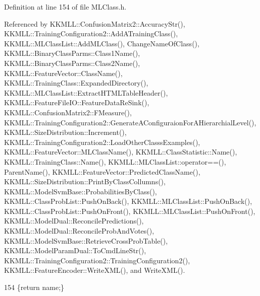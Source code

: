 Definition at line 154 of file M\+L\+Class.\+h.



Referenced by K\+K\+M\+L\+L\+::\+Confusion\+Matrix2\+::\+Accuracy\+Str(), K\+K\+M\+L\+L\+::\+Training\+Configuration2\+::\+Add\+A\+Training\+Class(), K\+K\+M\+L\+L\+::\+M\+L\+Class\+List\+::\+Add\+M\+L\+Class(), Change\+Name\+Of\+Class(), K\+K\+M\+L\+L\+::\+Binary\+Class\+Parms\+::\+Class1\+Name(), K\+K\+M\+L\+L\+::\+Binary\+Class\+Parms\+::\+Class2\+Name(), K\+K\+M\+L\+L\+::\+Feature\+Vector\+::\+Class\+Name(), K\+K\+M\+L\+L\+::\+Training\+Class\+::\+Expanded\+Directory(), K\+K\+M\+L\+L\+::\+M\+L\+Class\+List\+::\+Extract\+H\+T\+M\+L\+Table\+Header(), K\+K\+M\+L\+L\+::\+Feature\+File\+I\+O\+::\+Feature\+Data\+Re\+Sink(), K\+K\+M\+L\+L\+::\+Confusion\+Matrix2\+::\+F\+Measure(), K\+K\+M\+L\+L\+::\+Training\+Configuration2\+::\+Generate\+A\+Configuraion\+For\+A\+Hierarchial\+Level(), K\+K\+M\+L\+L\+::\+Size\+Distribution\+::\+Increment(), K\+K\+M\+L\+L\+::\+Training\+Configuration2\+::\+Load\+Other\+Classs\+Examples(), K\+K\+M\+L\+L\+::\+Feature\+Vector\+::\+M\+L\+Class\+Name(), K\+K\+M\+L\+L\+::\+Class\+Statistic\+::\+Name(), K\+K\+M\+L\+L\+::\+Training\+Class\+::\+Name(), K\+K\+M\+L\+L\+::\+M\+L\+Class\+List\+::operator==(), Parent\+Name(), K\+K\+M\+L\+L\+::\+Feature\+Vector\+::\+Predicted\+Class\+Name(), K\+K\+M\+L\+L\+::\+Size\+Distribution\+::\+Print\+By\+Class\+Collumns(), K\+K\+M\+L\+L\+::\+Model\+Svm\+Base\+::\+Probabilities\+By\+Class(), K\+K\+M\+L\+L\+::\+Class\+Prob\+List\+::\+Push\+On\+Back(), K\+K\+M\+L\+L\+::\+M\+L\+Class\+List\+::\+Push\+On\+Back(), K\+K\+M\+L\+L\+::\+Class\+Prob\+List\+::\+Push\+On\+Front(), K\+K\+M\+L\+L\+::\+M\+L\+Class\+List\+::\+Push\+On\+Front(), K\+K\+M\+L\+L\+::\+Model\+Dual\+::\+Reconcile\+Predictions(), K\+K\+M\+L\+L\+::\+Model\+Dual\+::\+Reconcile\+Prob\+And\+Votes(), K\+K\+M\+L\+L\+::\+Model\+Svm\+Base\+::\+Retrieve\+Cross\+Prob\+Table(), K\+K\+M\+L\+L\+::\+Model\+Param\+Dual\+::\+To\+Cmd\+Line\+Str(), K\+K\+M\+L\+L\+::\+Training\+Configuration2\+::\+Training\+Configuration2(), K\+K\+M\+L\+L\+::\+Feature\+Encoder\+::\+Write\+X\+M\+L(), and Write\+X\+M\+L().


\begin{DoxyCode}
154 \{\textcolor{keywordflow}{return}  name;\}
\end{DoxyCode}
